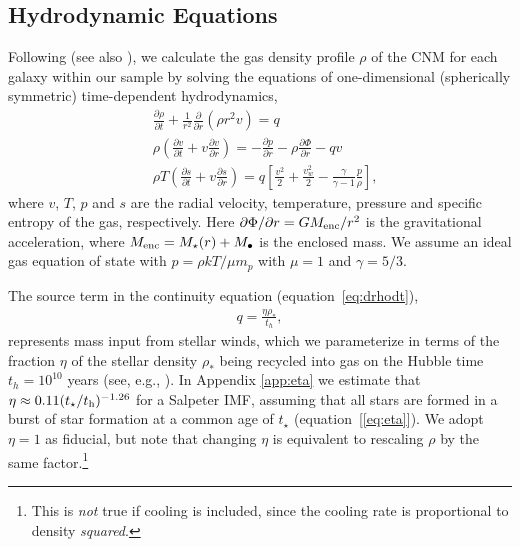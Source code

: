 \documentclass[usenatbib,fleqn]{mn2e}
\newcommand{\dxdy}[2]{\frac{\partial #1}{\partial #2} }
\newcommand{\drhodt}{\dxdy{\rho}{t}}
\newcommand{\dpdr}{\dxdy{p}{r}}
\newcommand{\dphidr}{\dxdy{\Phi}{r}}
\newcommand{\ke}{\frac{v^2}{2}}
\newcommand{\kew}{\frac{v_w^2}{2}}
\newcommand{\gammaf}{\frac{\gamma}{\gamma-1}}
\newcommand{\cs}{\frac{p}{\rho}}
\newcommand{\rhostar}{\rho_*}
\newcommand{\Mbh}[1][]{M_{\bullet#1}}
\renewcommand{\th}{t_h}
\begin{document}


\subsection{Hydrodynamic Equations}
\label{sec:hydro}

Following \citet{Quataert:2004a} (see also \citealt{HolzerAxford:1970a,De-ColleGuillochon+:2012a,ShcherbakovWong+:2014a}), we calculate the gas density profile $\rho$ of the CNM for each galaxy within our sample by solving the equations of one-dimensional (spherically symmetric) time-dependent hydrodynamics,
\begin{align}
  &\drhodt+\frac{1}{r^2}\frac{\partial}{\partial r}\left(\rho r^2 v\right)=q \label{eq:drhodt}\\
  &\rho \left(\frac{\partial v}{\partial t} + v\frac{\partial v}{\partial r}\right) =-\dpdr-\rho \dphidr-q v \label{eq:dvdt}\\
  &\rho T\left(\frac{\partial s}{\partial t} + v\frac{\partial
      s}{\partial r}\right)=q\left[\ke+\kew-\gammaf \cs \right] 
, 
\label{eq:dsdt}
\end{align}
where $v$, $T$, $p$ and $s$ are the radial velocity, temperature,
pressure and specific entropy of the gas, respectively.  Here $\partial
\Phi/\partial r = GM_{\rm enc}/r^{2}$ is the gravitational
acceleration, where $M_{\rm enc} = M_{\star}(r) + \Mbh$ is the
enclosed mass.  We assume an ideal gas equation of state with $p =
\rho kT/\mu m_p$ with $\mu = 1$  and $\gamma = 5/3$.  

The source term in the continuity equation (equation~\ref{eq:drhodt}),
\begin{align}
  q=\frac{\eta \rhostar}{\th},
\label{eq:q}
\end{align}
represents mass input from stellar winds, which we parameterize in
terms of the fraction $\eta$ of the stellar density $\rhostar$ being
recycled into gas on the Hubble time $\th = 10^{10}$ years (see, e.g.,
\citealt{Ciotti+91}).  In Appendix \ref{app:eta} we estimate that
$\eta \approx 0.11(t_{\star}/t_{\rm h})^{-1.26}$ for a Salpeter IMF,
assuming that all stars are formed in a burst of star formation at a
common age of $t_{\star}$ (equation~[\ref{eq:eta}]).  We adopt
$\eta=1$ as fiducial, but note that changing $\eta$ is equivalent to
rescaling $\rho$ by the same factor.\footnote{This is {\it not} true
  if cooling is included, since the cooling rate is proportional to
  density {\it squared}.}
\end{document}
